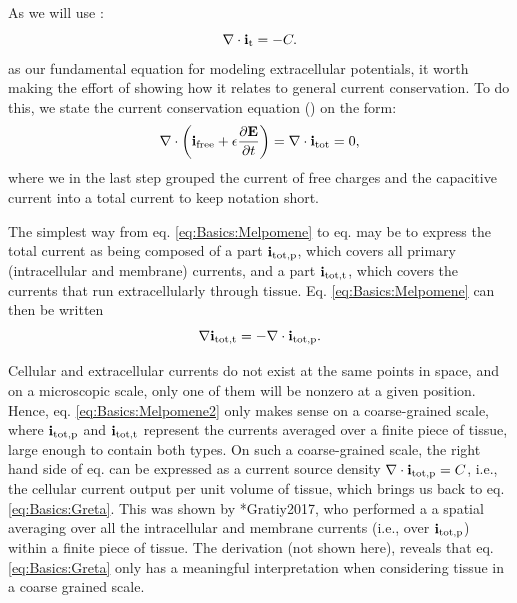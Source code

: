 \subsection{ }
As we will use :
\begin{equation}
{\bf \nabla} \cdot {\bf i_\text{t}} = -C.
\label{eq:Basics:Greta}
\end{equation}
as our fundamental equation for modeling extracellular potentials, it worth making the effort of showing how it relates to general current conservation. To do this, we state the current conservation equation () on the form:
\begin{equation}
{\bf \nabla} \cdot \left( {\bf i}_ \text{free} +  \epsilon \frac{\partial {\bf E}}{\partial t} \right) = {\bf \nabla} \cdot {\bf i}_\text{tot}  = 0, 
\label{eq:Basics:Melpomene}
\end{equation}
where we in the last step grouped the current of free charges and the capacitive current into a total current to keep notation short. 

The simplest way from eq. \ref{eq:Basics:Melpomene} to eq. \label{eq:Basics:Greta} may be to express the total current as being composed of a part ${\bf i}_\text{tot,p}$, which covers all primary (intracellular and membrane) currents, and a part ${\bf i}_\text{tot,t}$, which covers the currents that run extracellularly through tissue. Eq. \ref{eq:Basics:Melpomene} can then be written
\begin{equation}
{\bf \nabla} {\bf i}_\text{tot,t} = - {\bf \nabla} \cdot {\bf i}_\text{tot,p}.
\label{eq:Basics:Melpomene2}
\end{equation}

Cellular and extracellular currents do not exist at the same points in space, and on a microscopic scale,  only one of them will be nonzero at a given position. Hence, eq. \ref{eq:Basics:Melpomene2} only makes sense on a coarse-grained scale, where ${\bf i}_\text{tot,p}$ and ${\bf i}_\text{tot,t}$ represent the currents averaged over a finite piece of tissue, large enough to contain both types. On such a coarse-grained scale, the right hand side of eq. \label{eq:Basics:Melpomene2} can be expressed as a current source density ${\bf \nabla} \cdot {\bf i}_\text{tot,p} = C$, i.e., the cellular current output per unit volume of tissue, which brings us back to eq. \ref{eq:Basics:Greta}. This was shown by \citeasnoun**{Gratiy2017}, who performed a a spatial averaging over all the intracellular and membrane currents (i.e., over ${\bf i}_\text{tot,p}$) within a finite piece of tissue. The derivation (not shown here), reveals that eq. \ref{eq:Basics:Greta} only has a meaningful interpretation when considering tissue in a coarse grained scale.

